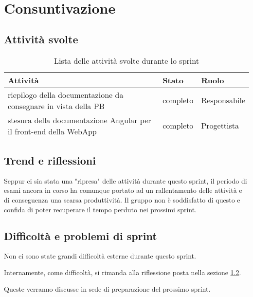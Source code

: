 \section{Consuntivazione}

\subsection{Attività svolte}

\begin{table}[H]
    \begin{xltabular}{\textwidth}{X l l}

         \textbf{Attività} & \textbf{Stato} & \textbf{Ruolo}\\
        \endhead
        \hline
        riepilogo della documentazione da consegnare in vista della PB & completo & Responsabile \\
        stesura della documentazione Angular per il front-end della WebApp & completo & Progettista \\
    \end{xltabular}
    \caption{Lista delle attività svolte durante lo sprint}
\end{table}

\subsection{Trend e riflessioni}\label{subsec:trend}

Seppur ci sia stata una "ripresa" delle attività durante questo sprint, il periodo di esami ancora in corso ha comunque portato ad un rallentamento delle attività e di conseguenza una scarsa produttività. Il gruppo non è soddisfatto di questo e confida di poter recuperare il tempo perduto nei prossimi sprint.

\subsection{Difficoltà e problemi di sprint}

Non ci sono state grandi difficoltà esterne durante questo sprint.

Internamente, come difficoltà, si rimanda alla riflessione posta nella sezione \ref{subsec:trend}.

Queste verranno discusse in sede di preparazione del prossimo sprint.